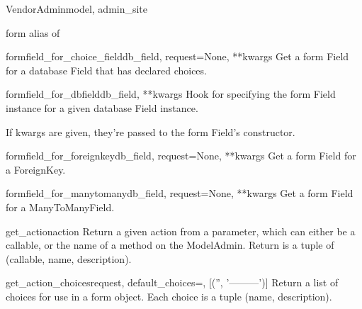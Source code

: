 \documentclass[letterpaper,10pt,english]{sphinxmanual}
\begin{document}
\begin{classdesc}{VendorAdmin}{model, admin\_site}
\hypertarget{data.admin.VendorAdmin.form}{}\begin{memberdesc}{form}
alias of 
\end{memberdesc}

\hypertarget{data.admin.VendorAdmin.formfield_for_choice_field}{}\begin{methoddesc}{formfield\_for\_choice\_field}{db\_field, request=None, **kwargs}
Get a form Field for a database Field that has declared choices.
\end{methoddesc}

\hypertarget{data.admin.VendorAdmin.formfield_for_dbfield}{}\begin{methoddesc}{formfield\_for\_dbfield}{db\_field, **kwargs}
Hook for specifying the form Field instance for a given database Field
instance.

If kwargs are given, they're passed to the form Field's constructor.
\end{methoddesc}

\hypertarget{data.admin.VendorAdmin.formfield_for_foreignkey}{}\begin{methoddesc}{formfield\_for\_foreignkey}{db\_field, request=None, **kwargs}
Get a form Field for a ForeignKey.
\end{methoddesc}

\hypertarget{data.admin.VendorAdmin.formfield_for_manytomany}{}\begin{methoddesc}{formfield\_for\_manytomany}{db\_field, request=None, **kwargs}
Get a form Field for a ManyToManyField.
\end{methoddesc}

\hypertarget{data.admin.VendorAdmin.get_action}{}\begin{methoddesc}{get\_action}{action}
Return a given action from a parameter, which can either be a callable,
or the name of a method on the ModelAdmin.  Return is a tuple of
(callable, name, description).
\end{methoddesc}

\hypertarget{data.admin.VendorAdmin.get_action_choices}{}\begin{methoddesc}{get\_action\_choices}{request, default\_choices=, {[}('', '---------'){]}}
Return a list of choices for use in a form object.  Each choice is a
tuple (name, description).
\end{methoddesc}


\end{classdesc}
\end{document}
